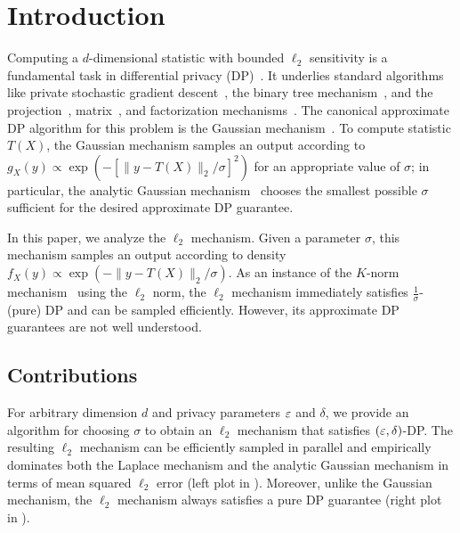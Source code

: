 \section{Introduction}
\label{sec:intro}
Computing a $d$-dimensional statistic with bounded $\ell_2$ sensitivity is a fundamental task in differential privacy (DP)~\cite{DMNS06}. It underlies standard algorithms like private stochastic gradient descent~\cite{SCS13, ACGMM+16}, the binary tree mechanism~\cite{CSS11, DNPR10}, and the projection~\cite{NTZ13, N23B}, matrix~\cite{LMHMR15, MMHM18}, and factorization mechanisms~\cite{ENU20, NT23}. The canonical approximate DP algorithm for this problem is the Gaussian mechanism~\cite{DMNS06}. To compute statistic $T(X)$, the Gaussian mechanism samples an output according to $g_X(y) \propto \exp(-[\|y - T(X)\|_2/\sigma]^2)$ for an appropriate value of $\sigma$; in particular, the analytic Gaussian mechanism~\cite{BW18} chooses the smallest possible $\sigma$ sufficient for the desired approximate DP guarantee.

In this paper, we analyze the $\ell_2$ mechanism. Given a parameter $\sigma$, this mechanism samples an output according to density $f_X(y) \propto \exp(-\|y - T(X)\|_2/\sigma)$. As an instance of the $K$-norm mechanism~\cite{HT10} using the $\ell_2$ norm, the $\ell_2$ mechanism immediately satisfies $\frac{1}{\sigma}$-(pure) DP and can be sampled efficiently. However, its approximate DP guarantees are not well understood.

\subsection{Contributions}
\label{subsec:contributions}
For arbitrary dimension $d$ and privacy parameters $\varepsilon$ and $\delta$, we provide an algorithm for choosing $\sigma$ to obtain an $\ell_2$ mechanism that satisfies $(\varepsilon, \delta)$-DP. The resulting $\ell_2$ mechanism can be efficiently sampled in parallel and empirically dominates both the Laplace mechanism and the analytic Gaussian mechanism in terms of mean squared $\ell_2$ error (left plot in ). Moreover, unlike the Gaussian mechanism, the $\ell_2$ mechanism always satisfies a pure DP guarantee (right plot in ).

